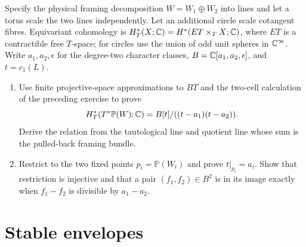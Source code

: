 \begin{exercise}
Specify the physical framing decomposition $W=W_1\oplus W_2$
into lines and let a torus scale the two lines independently.
Let an additional circle scale cotangent fibres.
Equivariant cohomology is
$H_T^*(X;\mathbb C)=H^*(ET\times_T X;\mathbb C)$, where $ET$ is a
contractible free $T$-space; for circles use the union of odd
unit spheres in $\mathbb C^\infty$.
Write $a_1,a_2,\epsilon$ for the degree-two character classes,
$B=\mathbb C[a_1,a_2,\epsilon]$, and $t=c_1(L)$.
\begin{enumerate}[label=(\alph*)]
\item Use finite projective-space approximations to $BT$ and
the two-cell calculation of the preceding exercise to prove
\[
 H_T^*(T^*\mathbb P(W);\mathbb C)
 =B[t]/((t-a_1)(t-a_2)).
\]
Derive the relation from the tautological line and quotient
line whose sum is the pulled-back framing bundle.
\item Restrict to the two fixed points $p_i=\mathbb P(W_i)$
and prove $t|_{p_i}=a_i$. Show that restriction is injective
and that a pair $(f_1,f_2)\in B^2$ is in its image exactly
when $f_1-f_2$ is divisible by $a_1-a_2$.
\end{enumerate}
\end{exercise}

\section{Stable envelopes}

